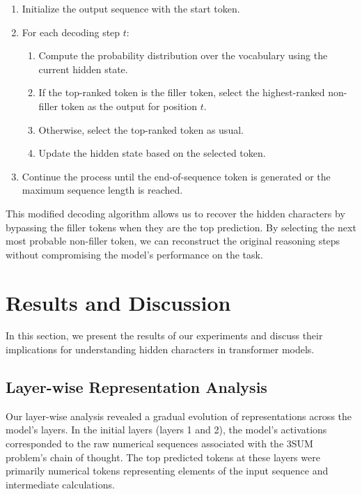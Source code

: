 \documentclass{article}
\begin{document}
\begin{enumerate}
    \item Initialize the output sequence with the start token.
    \item For each decoding step $t$:
    \begin{enumerate}
        \item Compute the probability distribution over the vocabulary using the current hidden state.
        \item If the top-ranked token is the filler token, select the highest-ranked non-filler token as the output for position $t$.
        \item Otherwise, select the top-ranked token as usual.
        \item Update the hidden state based on the selected token.
    \end{enumerate}
    \item Continue the process until the end-of-sequence token is generated or the maximum sequence length is reached.
\end{enumerate}

This modified decoding algorithm allows us to recover the hidden characters by bypassing the filler tokens when they are the top prediction. By selecting the next most probable non-filler token, we can reconstruct the original reasoning steps without compromising the model's performance on the task.

\section{Results and Discussion}

In this section, we present the results of our experiments and discuss their implications for understanding hidden characters in transformer models.

\subsection{Layer-wise Representation Analysis}

Our layer-wise analysis revealed a gradual evolution of representations across the model's layers. In the initial layers (layers 1 and 2), the model's activations corresponded to the raw numerical sequences associated with the 3SUM problem's chain of thought. The top predicted tokens at these layers were primarily numerical tokens representing elements of the input sequence and intermediate calculations.
\end{document}
